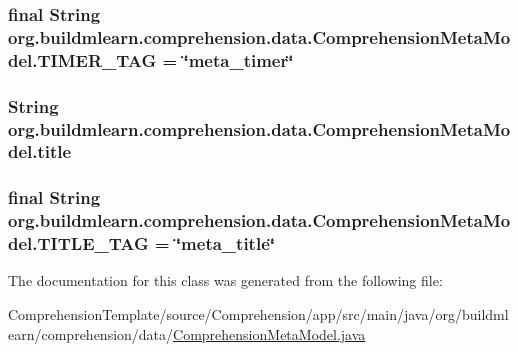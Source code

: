 \subsubsection[{\texorpdfstring{T\+I\+M\+E\+R\+\_\+\+T\+AG}{TIMER_TAG}}]{\setlength{\rightskip}{0pt plus 5cm}final String org.\+buildmlearn.\+comprehension.\+data.\+Comprehension\+Meta\+Model.\+T\+I\+M\+E\+R\+\_\+\+T\+AG = \char`\"{}meta\+\_\+timer\char`\"{}\hspace{0.3cm}{\ttfamily [static]}}\hypertarget{classorg_1_1buildmlearn_1_1comprehension_1_1data_1_1ComprehensionMetaModel_ae53e4612b6c50f2fa0840d70e1401123}{}\label{classorg_1_1buildmlearn_1_1comprehension_1_1data_1_1ComprehensionMetaModel_ae53e4612b6c50f2fa0840d70e1401123}
\subsubsection[{\texorpdfstring{title}{title}}]{\setlength{\rightskip}{0pt plus 5cm}String org.\+buildmlearn.\+comprehension.\+data.\+Comprehension\+Meta\+Model.\+title\hspace{0.3cm}{\ttfamily [private]}}\hypertarget{classorg_1_1buildmlearn_1_1comprehension_1_1data_1_1ComprehensionMetaModel_a7477c70ed310977d2940c96e79102c6d}{}\label{classorg_1_1buildmlearn_1_1comprehension_1_1data_1_1ComprehensionMetaModel_a7477c70ed310977d2940c96e79102c6d}
\subsubsection[{\texorpdfstring{T\+I\+T\+L\+E\+\_\+\+T\+AG}{TITLE_TAG}}]{\setlength{\rightskip}{0pt plus 5cm}final String org.\+buildmlearn.\+comprehension.\+data.\+Comprehension\+Meta\+Model.\+T\+I\+T\+L\+E\+\_\+\+T\+AG = \char`\"{}meta\+\_\+title\char`\"{}\hspace{0.3cm}{\ttfamily [static]}}\hypertarget{classorg_1_1buildmlearn_1_1comprehension_1_1data_1_1ComprehensionMetaModel_a0262e00ac9c06cb3be649762be3323b5}{}\label{classorg_1_1buildmlearn_1_1comprehension_1_1data_1_1ComprehensionMetaModel_a0262e00ac9c06cb3be649762be3323b5}


The documentation for this class was generated from the following file\+:\begin{DoxyCompactItemize}
\item 
Comprehension\+Template/source/\+Comprehension/app/src/main/java/org/buildmlearn/comprehension/data/\hyperlink{ComprehensionMetaModel_8java}{Comprehension\+Meta\+Model.\+java}\end{DoxyCompactItemize}
